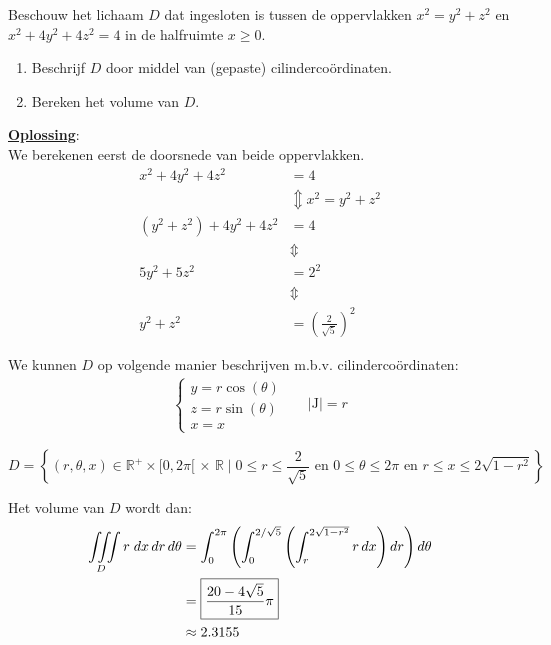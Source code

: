 \documentclass[kulak]{kulakarticle} %
\newcommand{\R}{\mathbb{R}}
\renewcommand{\boxed}[1]{\text{\fboxsep=.3em\fbox{#1}}}
\begin{document}
	Beschouw het lichaam \(D\) dat ingesloten is tussen de oppervlakken \(x^2=y^2+z^2\) en \(x^2+4y^2+4z^2=4\) in de halfruimte \(x\geq0\).

	\begin{enumerate}
		\item Beschrijf \(D\) door middel van (gepaste) cilindercoördinaten.
		\item Bereken het volume van \(D\).
	\end{enumerate}

	\textbf{\underline{Oplossing}}: \\

	We berekenen eerst de doorsnede van beide oppervlakken.
	\begin{align*}
		x^2+4y^2+4z^2 &=4 \\
		& \Updownarrow x^2 = y^2+z^2 \\
		(y^2+z^2) + 4y^2 + 4z^2 &= 4 \\
		& \Updownarrow \\
		5y^2+5z^2&=2^2 \\
		& \Updownarrow \\
		y^2 + z^2 &= \left( \frac{2}{\sqrt{5}} \right)^2
	\end{align*}

	We kunnen \(D\) op volgende manier beschrijven m.b.v. cilindercoördinaten:
	\renewcommand{\arraystretch}{1}
	\begin{align*}
	\left\{
	\begin{array}{l}
		y = r \cos(\theta)\\
		z = r \sin(\theta)\\
		x = x
	\end{array}
	\right. & & |\mathrm{J}| = r
	\end{align*}

	\[D = \left\{ (r,\theta,x) \in \R^{+} \times [0,2\pi[ \, \times \, \R \mid 0 \leq r \leq \frac{2}{\sqrt{5}} \text{ en } 0 \leq \theta \leq 2\pi \text{ en } r \leq x \leq 2\sqrt{1-r^2} \right\}\]

	Het volume van \(D\) wordt dan:
	\begin{align*}
		\iiint\limits_D r\;dx \, dr \, d\theta &= \int_0^{2\pi} \left( \int_0^{2/\sqrt{5}} \left( \int_{r}^{2\sqrt{1-r^2}} r \, dx \right) dr \right) d\theta \\
		& = \boxed{\(\frac{20-4\sqrt{5}}{15}\pi\)} \\
		& \approx 2.3155
	\end{align*}

	\newpage
\end{document}
